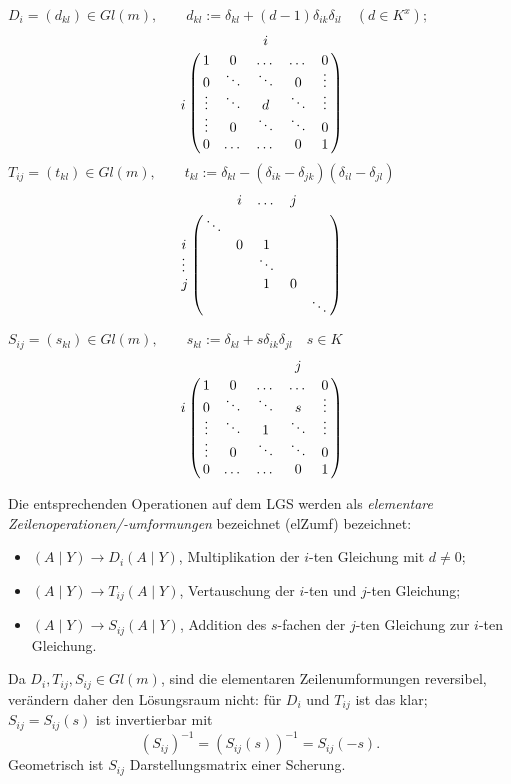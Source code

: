 		$ D_i = (d_{kl})\in Gl(m), \qquad
			d_{kl} := \delta_{kl}+(d-1)\delta_{ik}\delta_{il}\quad (d\in K^x); $
                \[
                \bordermatrix{
                    &   &   & i & &\cr
                    & 1 & 0 & \dots & \dots & 0\cr 
                    & 0 & \ddots & \ddots & 0 & \vdots \cr
                i & \vdots & \ddots & d & \ddots & \vdots \cr
                    & \vdots & 0  &  \ddots & \ddots & 0 \cr
                    & 0 &  \dots & \dots  & 0 & 1 \cr
                }
                \]
		$ T_{ij} = (t_{kl})\in Gl(m), \qquad
			 t_{kl} := \delta_{kl}-(\delta_{ik}-\delta_{jk})(\delta_{il}-\delta_{jl})$
                \[
                \bordermatrix{
                      &        & i      & \dots  & j     &         \cr
                      & \ddots &        &        &       &         \cr 
                i     &        & 0      & 1      &       &         \cr
                \vdots&        &        & \ddots &       &         \cr
                j     &        &        & 1      & 0     &         \cr
                      &        &        &        &       & \ddots  \cr
                }
                \]
                
		$ S_{ij}=(s_{kl})\in Gl(m), \qquad
			 s_{kl} := \delta_{kl}+s\delta_{ik}\delta_{jl} \quad s\in K$
                \[
                \bordermatrix{
                    &   &   &  & j &\cr
                    & 1 & 0 & \dots & \dots & 0\cr 
                i & 0 & \ddots & \ddots & s & \vdots \cr
                    & \vdots & \ddots & 1 & \ddots & \vdots \cr
                    & \vdots & 0  &  \ddots & \ddots & 0 \cr
                    & 0 &  \dots & \dots  & 0 & 1 \cr
                }
                \]
	
	Die entsprechenden Operationen auf dem LGS werden als \emph{elementare Zeilenoperationen/-umformungen} bezeichnet (elZumf) bezeichnet:
	\begin{itemize}
		\item $ (A\mid Y) \to D_i (A\mid Y) $, Multiplikation der $ i $-ten Gleichung mit $ d\neq 0 $;
		\item $ (A\mid Y) \to T_{ij} (A\mid Y) $, Vertauschung der $ i $-ten und $ j $-ten Gleichung;
		\item $ (A\mid Y) \to S_{ij} (A\mid Y)$, Addition des $ s $-fachen der $ j $-ten Gleichung zur $ i $-ten Gleichung.
	\end{itemize}
	Da $ D_i,T_{ij},S_{ij}\in Gl(m) $, sind die elementaren Zeilenumformungen reversibel, verändern daher den Lösungsraum nicht: für $ D_i $ und $ T_{ij} $ ist das klar; $ S_{ij} = S_{ij}(s) $ ist invertierbar mit
		\[ (S_{ij})^{-1} = (S_{ij}(s))^{-1} = S_{ij}(-s). \]
	Geometrisch ist $ S_{ij} $ Darstellungsmatrix einer Scherung.
	
